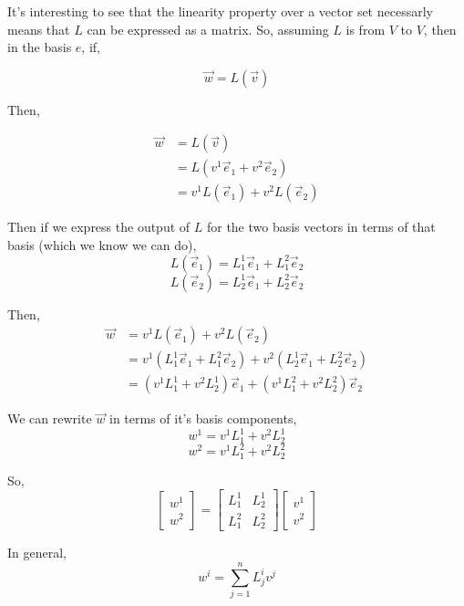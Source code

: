\documentclass[12pt]{book}
\theoremstyle{plain}
\theoremstyle{definition}
\theoremstyle{ppart}
\theoremstyle{case}
\theoremstyle{solution}
\begin{document}
It's interesting to see that the linearity property over a vector set necessarly means that $L$ can be expressed as a matrix.
So, assuming $L$ is from $V$ to $V$, then in the basis $e$, if,

\[ \vec{w} = L(\vec{v}) \]

Then,

\begin{align*}
  \vec{w} &= L(\vec{v}) \\
  &= L(v^1 \vec{e}_1 + v^2 \vec{e}_2) \\
  &= v^1 L(\vec{e}_1) + v^2 L(\vec{e}_2)
\end{align*}

Then if we express the output of $L$ for the two basis vectors in terms of that basis (which we know we can do),
\[ L(\vec{e}_1) = L^1_1 \vec{e}_1 + L^2_1 \vec{e}_2 \]
\[ L(\vec{e}_2) = L^1_2 \vec{e}_1 + L^2_2 \vec{e}_2 \]

Then, 
\begin{align*}
  \vec{w} 
  &= v^1 L(\vec{e}_1) + v^2 L(\vec{e}_2) \\
  &= v^1 (L^1_1 \vec{e}_1 + L^2_1 \vec{e}_2) + v^2 (L^1_2 \vec{e}_1 + L^2_2 \vec{e}_2) \\
  &= (v^1 L^1_1 + v^2 L^1_2) \vec{e}_1 + (v^1 L^2_1 + v^2 L^2_2) \vec{e}_2
\end{align*}

We can rewrite $\vec{w}$ in terms of it's basis components,
\[ w^1 = v^1 L^1_1 + v^2 L^1_2 \]
\[ w^2 = v^1 L^2_1 + v^2 L^2_2 \]

So,
\[
  \begin{bmatrix}
  w^1 \\
  w^2
  \end{bmatrix}
  =
  \begin{bmatrix}
  L^1_1 & L^1_2 \\
  L^2_1 & L^2_2
  \end{bmatrix}
  \begin{bmatrix}
  v^1 \\
  v^2
  \end{bmatrix}
\]

In general,
\[ w^i = \sum_{j=1}^n L^i_j v^j \]



\end{document}
